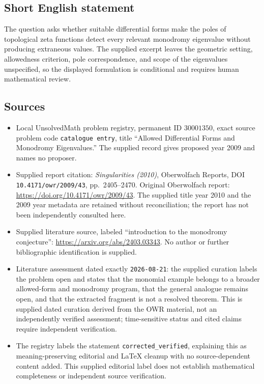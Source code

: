 \documentclass[11pt]{article}
\begin{document}
\subsection{Short English statement}
The question asks whether suitable differential forms make the poles of topological zeta functions detect every relevant monodromy eigenvalue without producing extraneous values. The supplied excerpt leaves the geometric setting, allowedness criterion, pole correspondence, and scope of the eigenvalues unspecified, so the displayed formulation is conditional and requires human mathematical review.
\subsection{Sources}
\begin{itemize}
\item Local UnsolvedMath problem registry, permanent ID \(30001350\), exact source problem code \texttt{catalogue entry}, title ``Allowed Differential Forms and Monodromy Eigenvalues.'' The supplied record gives proposed year 2009 and names no proposer.
\item Supplied report citation: \emph{Singularities (2010)}, Oberwolfach Reports, DOI \texttt{10.4171/owr/2009/43}, pp.\ 2405--2470. Original Oberwolfach report: \url{https://doi.org/10.4171/owr/2009/43}. The supplied title year 2010 and the 2009 year metadata are retained without reconciliation; the report has not been independently consulted here.
\item Supplied literature source, labeled ``introduction to the monodromy conjecture'': \url{https://arxiv.org/abs/2403.03343}. No author or further bibliographic identification is supplied.
\item Literature assessment dated exactly \texttt{2026-08-21}: the supplied curation labels the problem open and states that the monomial example belongs to a broader allowed-form and monodromy program, that the general analogue remains open, and that the extracted fragment is not a resolved theorem. This is supplied dated curation derived from the OWR material, not an independently verified assessment; time-sensitive status and cited claims require independent verification.
\item The registry labels the statement \texttt{corrected\_verified}, explaining this as meaning-preserving editorial and LaTeX cleanup with no source-dependent content added. This supplied editorial label does not establish mathematical completeness or independent source verification.
\end{itemize}
\end{document}
